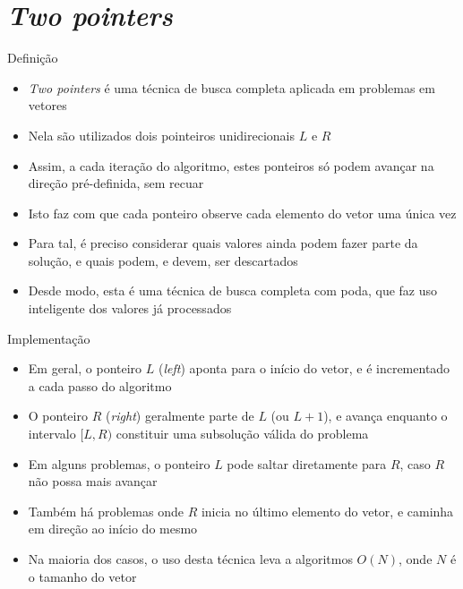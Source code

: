 \section{\it Two pointers}

\begin{frame}[fragile]{Definição}

    \begin{itemize}
        \item \textit{Two pointers} é uma técnica de busca completa aplicada em problemas em
            vetores

        \item Nela são utilizados dois pointeiros unidirecionais $L$ e $R$

        \item Assim, a cada iteração do algoritmo, estes ponteiros só podem avançar na direção
            pré-definida, sem recuar

        \item Isto faz com que cada ponteiro observe cada elemento do vetor uma única vez

        \item Para tal, é preciso considerar quais valores ainda podem fazer parte da solução,
            e quais podem, e devem, ser descartados

        \item Desde modo, esta é uma técnica de busca completa com poda, que faz uso inteligente
            dos valores já processados

    \end{itemize}

\end{frame}

\begin{frame}[fragile]{Implementação}

    \begin{itemize}
        \item Em geral, o ponteiro $L$ (\textit{left}) aponta para o início do vetor, e é incrementado
            a cada passo do algoritmo

        \item O ponteiro $R$ (\textit{right}) geralmente parte de $L$ (ou $L + 1$), e avança enquanto
            o intervalo $[L, R)$ constituir uma subsolução válida do problema

        \item Em alguns problemas, o ponteiro $L$ pode saltar diretamente para $R$, caso $R$ não
            possa mais avançar

        \item Também há problemas onde $R$ inicia no último elemento do vetor, e caminha em direção
            ao início do mesmo

        \item Na maioria dos casos, o uso desta técnica leva a algoritmos $O(N)$, onde $N$ é o tamanho
            do vetor
    \end{itemize}

\end{frame}
